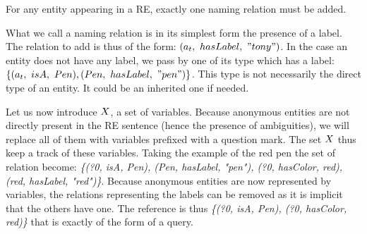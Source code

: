 \begin{theorem} 
\label{the:parlance_need}
For any entity appearing in a RE, exactly one naming relation must be added.
\end{theorem}

What we call a naming relation is in its simplest form the presence of a label. The relation to add is thus of the form: $(a_t,\ hasLabel,\ "tony")$. In the case an entity does not have any label, we pass by one of its type which has a label: $\{(\indiv_t,\ isA,\ Pen), (Pen,\ hasLabel,\ "pen")\}$. This type is not necessarily the direct type of an entity. It could be an inherited one if needed.

Let us now introduce $X$, a set of variables. Because anonymous entities are not directly present in the RE sentence (hence the presence of ambiguities), we will replace all of them with variables prefixed with a question mark. The set $X$ thus keep a track of these variables. Taking the example of the red pen the set of relation become: \textit{\{(?0, isA, Pen), (Pen, hasLabel, "pen"), (?0, hasColor, red), (red,  hasLabel, "red")\}}. Because anonymous entities are now represented by variables, the relations representing the labels can be removed as it is implicit that the others have one. The reference is thus \textit{\{(?0, isA, Pen), (?0, hasColor, red)\}} that is exactly of the form of a \sparql{} query.

